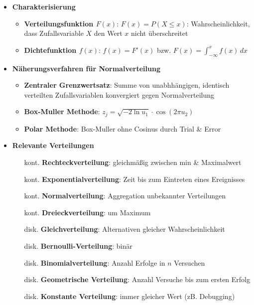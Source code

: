 \documentclass{article}
\begin{document}
\begin{itemize}
  \item \textbf{Charakterisierung}
        \begin{itemize}
          \item \textbf{Verteilungsfunktion $F(x)$}: $F(x) = P(X \leq x)$: Wahrscheinlichkeit, dass Zufallsvariable $X$ den Wert $x$ nicht überschreitet
          \item \textbf{Dichtefunktion $f(x)$}: $f(x) = F'(x)$ bzw. $F(x) = \int_{-\infty}^x f(x) \, dx$
        \end{itemize}
  \item \textbf{Näherungsverfahren für Normalverteilung}
        \begin{itemize}
          \item \textbf{Zentraler Grenzwertsatz}: Summe von unabhhängigen, identisch verteilten Zufallsvariablen konvergiert gegen Normalverteilung
          \item \textbf{Box-Muller Methode}: $z_j = \sqrt{-2 \ln u_1} \cdot \cos(2 \pi u_2)$
          \item \textbf{Polar Methode}: Box-Muller ohne Cosinus durch Trial \& Error
        \end{itemize}
  \item \textbf{Relevante Verteilungen}
        \begin{itemize}
          \item[kont.] \textbf{Rechteckverteilung}: gleichmäßig zwischen min \& Maximalwert
          \item[kont.] \textbf{Exponentialverteilung}: Zeit bis zum Eintreten eines Ereignisses
          \item[kont.] \textbf{Normalverteilung}: Aggregation unbekannter Verteilungen
          \item[kont.] \textbf{Dreieckverteilung}: um Maximum
          \item[disk.] \textbf{Gleichverteilung}: Alternativen gleicher Wahrscheinlichkeit
          \item[disk.] \textbf{Bernoulli-Verteilung}: binär
          \item[disk.] \textbf{Binomialverteilung}: Anzahl Erfolge in $n$ Versuchen
          \item[disk.] \textbf{Geometrische Verteilung}: Anzahl Versuche bis zum ersten Erfolg
          \item[disk.] \textbf{Konstante Verteilung}: immer gleicher Wert (zB. Debugging)
        \end{itemize}
\end{itemize}
\end{document}

